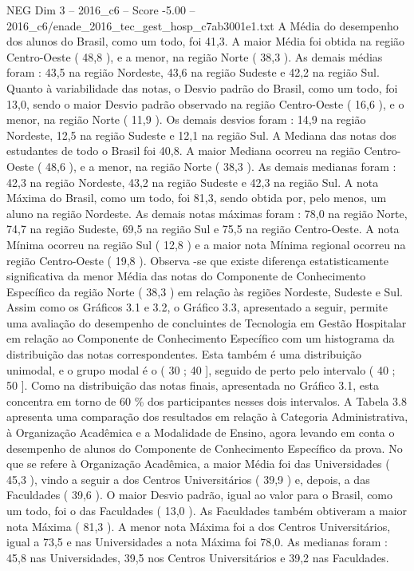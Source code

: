 \begin{textsample}{NEG Dim 3 – 2016\_c6 – Score -5.00 – 2016\_c6/enade\_2016\_tec\_gest\_hosp\_c7ab3001e1.txt}
A Média do desempenho dos alunos do Brasil, como um todo, foi 41,3.
A maior Média foi obtida na região Centro-Oeste ( 48,8 ), e a menor, na região Norte ( 38,3 ).
As demais médias foram : 43,5 na região Nordeste, 43,6 na região Sudeste e 42,2 na região Sul.
Quanto à variabilidade das notas, o Desvio padrão do Brasil, como um todo, foi 13,0, sendo o maior Desvio padrão observado na região Centro-Oeste ( 16,6 ), e o menor, na região Norte ( 11,9 ).
Os demais desvios foram : 14,9 na região Nordeste, 12,5 na região Sudeste e 12,1 na região Sul.
A Mediana das notas dos estudantes de todo o Brasil foi 40,8.
A maior Mediana ocorreu na região Centro-Oeste ( 48,6 ), e a menor, na região Norte ( 38,3 ).
As demais medianas foram : 42,3 na região Nordeste, 43,2 na região Sudeste e 42,3 na região Sul.
A nota Máxima do Brasil, como um todo, foi 81,3, sendo obtida por, pelo menos, um aluno na região Nordeste.
As demais notas máximas foram : 78,0 na região Norte, 74,7 na região Sudeste, 69,5 na região Sul e 75,5 na região Centro-Oeste.
A nota Mínima ocorreu na região Sul ( 12,8 ) e a maior nota Mínima regional ocorreu na região Centro-Oeste ( 19,8 ).
Observa -se que existe diferença estatisticamente significativa da menor Média das notas do Componente de Conhecimento Específico da região Norte ( 38,3 ) em relação às regiões Nordeste, Sudeste e Sul.
Assim como os Gráficos 3.1 e 3.2, o Gráfico 3.3, apresentado a seguir, permite uma avaliação do desempenho de concluintes de Tecnologia em Gestão Hospitalar em relação ao Componente de Conhecimento Específico com um histograma da distribuição das notas correspondentes.
Esta também é uma distribuição unimodal, e o grupo modal é o ( 30 ; 40 ], seguido de perto pelo intervalo ( 40 ; 50 ].
Como na distribuição das notas finais, apresentada no Gráfico 3.1, esta concentra em torno de 60 \% dos participantes nesses dois intervalos.
A Tabela 3.8 apresenta uma comparação dos resultados em relação à Categoria Administrativa, à Organização Acadêmica e a Modalidade de Ensino, agora levando em conta o desempenho de alunos do Componente de Conhecimento Específico da prova.
No que se refere à Organização Acadêmica, a maior Média foi das Universidades ( 45,3 ), vindo a seguir a dos Centros Universitários ( 39,9 ) e, depois, a das Faculdades ( 39,6 ).
O maior Desvio padrão, igual ao valor para o Brasil, como um todo, foi o das Faculdades ( 13,0 ).
As Faculdades também obtiveram a maior nota Máxima ( 81,3 ).
A menor nota Máxima foi a dos Centros Universitários, igual a 73,5 e nas Universidades a nota Máxima foi 78,0.
As medianas foram : 45,8 nas Universidades, 39,5 nos Centros Universitários e 39,2 nas Faculdades.

\end{textsample}

